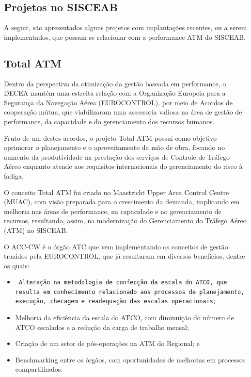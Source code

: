 \documentclass[
]{book}
\begin{document}
\hypertarget{projetos-no-sisceab}{%
\subsection{Projetos no SISCEAB}\label{projetos-no-sisceab}}

A seguir, são apresentados alguns projetos com implantações recentes, ou a serem implementados, que possam se relacionar com a performance ATM do SISCEAB.

\hypertarget{total-atm}{%
\subsection{Total ATM}\label{total-atm}}

Dentro da perspectiva da otimização da gestão baseada em performance, o DECEA mantém uma estreita relação com a Organização Europeia para a Segurança da Navegação Aérea (EUROCONTROL), por meio de Acordos de cooperação mútua, que viabilizaram uma assessoria valiosa na área de gestão de performance, da capacidade e do gerenciamento dos recursos humanos.

Fruto de um destes acordos, o projeto Total ATM possui como objetivo aprimorar o planejamento e o aproveitamento da mão de obra, focando no aumento da produtividade na prestação dos serviços de Controle de Tráfego Aéreo enquanto atende aos requisitos internacionais do gerenciamento do risco à fadiga.

O conceito Total ATM foi criado no Maastricht Upper Area Control Centre (MUAC), com visão preparada para o crescimento da demanda, implicando em melhoria nas áreas de performance, na capacidade e no gerenciamento de recursos, resultando, assim, na modernização do Gerenciamento do Tráfego Aéreo (ATM) no SISCEAB.

O ACC-CW é o órgão ATC que vem implementando os conceitos de gestão trazidos pela EUROCONTROL, que já resultaram em diversos benefícios, dentre os quais:

\begin{itemize}
\item
\begin{verbatim}
 Alteração na metodologia de confecção da escala do ATCO, que resulta em conhecimento relacionado aos processos de planejamento, execução, checagem e readequação das escalas operacionais;
\end{verbatim}
\item
  Melhoria da eficiência da escala do ATCO, com diminuição do número de ATCO escalados e a redução da carga de trabalho mensal;
\item
  Criação de um setor de pós-operações na ATM do Regional; e
\item
  Benchmarking entre os órgãos, com oportunidades de melhorias em processos compartilhados.
\end{itemize}
\end{document}
